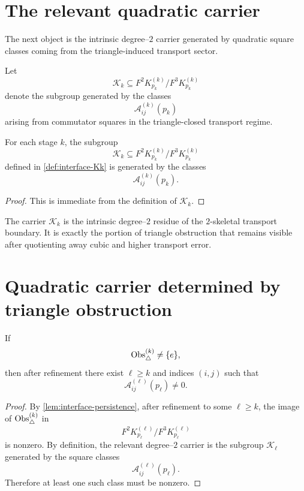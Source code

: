 \section{The relevant quadratic carrier}
\label{sec:interface-generation}
The next object is the intrinsic degree--\(2\) carrier generated by
quadratic square classes coming from the triangle-induced transport
sector.
\begin{definition}
	\label{def:interface-Kk}
	Let
	\[
		\mathcal K_k
		\subseteq
		F^2K_{p_k}^{(k)}/F^3K_{p_k}^{(k)}
	\]
	denote the subgroup generated by the classes
	\[
		\mathcal A_{ij}^{(k)}(p_k)
	\]
	arising from commutator squares in the triangle-closed transport
	regime.
\end{definition}
\begin{lemma}
	For each stage \(k\), the subgroup
	\[
		\mathcal K_k
		\subseteq
		F^2K_{p_k}^{(k)}/F^3K_{p_k}^{(k)}
	\]
	defined in \cref{def:interface-Kk} is generated by the classes
	\[
		\mathcal A_{ij}^{(k)}(p_k).
	\]
\end{lemma}
\begin{proof}
	This is immediate from the definition of \(\mathcal K_k\).
\end{proof}
\begin{remark}
	The carrier \(\mathcal K_k\) is the intrinsic degree--\(2\) residue of
	the \(2\)-skeletal transport boundary.
	It is exactly the portion of triangle obstruction that remains visible
	after quotienting away cubic and higher transport error.
\end{remark}
\section{Quadratic carrier determined by triangle obstruction}
\label{sec:interface-carrier}
\begin{theorem}
	\label{thm:interface-quad-carrier}
	If
	\[
		\operatorname{Obs}_\triangle^{(k)}\neq \{e\},
	\]
	then after refinement there exist \(\ell\ge k\) and indices
	\((i,j)\) such that
	\[
		\mathcal A_{ij}^{(\ell)}(p_\ell)\neq 0.
	\]
\end{theorem}
\begin{proof}
	By \cref{lem:interface-persistence}, after refinement to some
	\(\ell\ge k\), the image of \(\operatorname{Obs}_\triangle^{(k)}\) in
	\[
		F^2K_{p_\ell}^{(\ell)}/F^3K_{p_\ell}^{(\ell)}
	\]
	is nonzero.
	By definition, the relevant degree--\(2\) carrier is the subgroup
	\(\mathcal K_\ell\) generated by the square classes
	\[
		\mathcal A_{ij}^{(\ell)}(p_\ell).
	\]
	Therefore at least one such class must be nonzero.
\end{proof}
